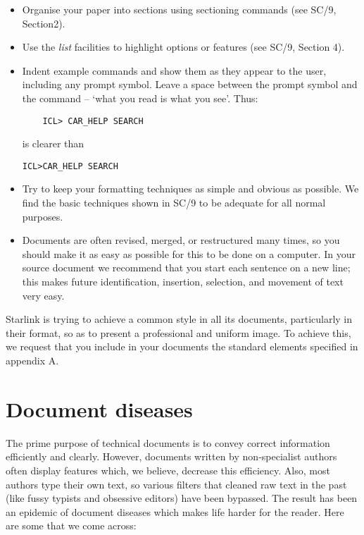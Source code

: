 \documentclass[twoside,11pt]{article}
\newcommand{\xref}[3]{#1}
\begin{document}
\begin{itemize}

\item Organise your paper into sections using sectioning commands (see
\xref{SC/9, Section2}{sc9}{document_structure}).

\item Use the {\em list}\/ facilities to highlight options or features
(see
\xref{SC/9, Section 4}{sc9}{lists}).

\item Indent example commands and show them as they appear to the user,
including any prompt symbol.
Leave a space between the prompt symbol and the command -- `what you read is
what you see'.
Thus:
\begin{verbatim}
    ICL> CAR_HELP SEARCH
\end{verbatim}
is clearer than
\begin{verbatim}
ICL>CAR_HELP SEARCH
\end{verbatim}

\item Try to keep your formatting techniques as simple and obvious as possible.
We find the basic techniques shown in \xref{SC/9}{sc9}{} to be adequate for
all normal purposes.

\item Documents are often revised, merged, or restructured many times, so
you should make it as easy as possible for this to be done on a computer.
In your source document we recommend that you start each sentence on a new
line; this makes future identification, insertion, selection, and movement
of text very easy.

\end{itemize}

Starlink is trying to achieve a common style in all its documents, particularly
in their format, so as to present a professional and uniform image.
To achieve this, we request that you include in your documents the standard
elements specified in appendix A.

\section{Document diseases}

The prime purpose of technical documents is to convey correct information
efficiently and clearly.
However, documents written by non-specialist authors often display features
which, we believe, decrease this efficiency.
Also, most authors type their own text, so various filters that cleaned raw
text in the past (like fussy typists and obsessive editors) have been bypassed.
The result has been an epidemic of document diseases which makes life harder
for the reader.
Here are some that we come across:
\end{document}
